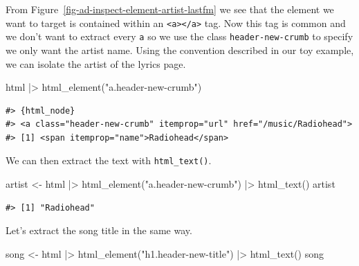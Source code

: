 \documentclass[
  letterpaper,
]{scrbook}
\newenvironment{Shaded}{\begin{snugshade}}{\end{snugshade}}
\newcommand{\FunctionTok}[1]{\textcolor[rgb]{0.00,0.00,0.00}{#1}}
\newcommand{\NormalTok}[1]{\textcolor[rgb]{0.00,0.00,0.00}{#1}}
\newcommand{\OtherTok}[1]{\textcolor[rgb]{0.00,0.00,0.00}{#1}}
\newcommand{\SpecialCharTok}[1]{\textcolor[rgb]{0.00,0.00,0.00}{#1}}
\newcommand{\StringTok}[1]{\textcolor[rgb]{0.00,0.00,0.00}{#1}}
\begin{document}
From Figure~\ref{fig-ad-inspect-element-artist-lastfm} we see that the
element we want to target is contained within an
\texttt{\textless{}a\textgreater{}\textless{}/a\textgreater{}} tag. Now
this tag is common and we don't want to extract every \texttt{a} so we
use the class \texttt{header-new-crumb} to specify we only want the
artist name. Using the convention described in our toy example, we can
isolate the artist of the lyrics page.

\begin{Shaded}
\begin{Highlighting}[]
\NormalTok{html }\SpecialCharTok{|\textgreater{}} 
  \FunctionTok{html\_element}\NormalTok{(}\StringTok{"a.header{-}new{-}crumb"}\NormalTok{)}
\end{Highlighting}
\end{Shaded}

\begin{verbatim}
#> {html_node}
#> <a class="header-new-crumb" itemprop="url" href="/music/Radiohead">
#> [1] <span itemprop="name">Radiohead</span>
\end{verbatim}

We can then extract the text with \texttt{html\_text()}.

\begin{Shaded}
\begin{Highlighting}[]
\NormalTok{artist }\OtherTok{\textless{}{-}} 
\NormalTok{  html }\SpecialCharTok{|\textgreater{}} 
  \FunctionTok{html\_element}\NormalTok{(}\StringTok{"a.header{-}new{-}crumb"}\NormalTok{) }\SpecialCharTok{|\textgreater{}} 
  \FunctionTok{html\_text}\NormalTok{()}
\NormalTok{artist}
\end{Highlighting}
\end{Shaded}

\begin{verbatim}
#> [1] "Radiohead"
\end{verbatim}

Let's extract the song title in the same way.

\begin{Shaded}
\begin{Highlighting}[]
\NormalTok{song }\OtherTok{\textless{}{-}} 
\NormalTok{  html }\SpecialCharTok{|\textgreater{}} 
  \FunctionTok{html\_element}\NormalTok{(}\StringTok{"h1.header{-}new{-}title"}\NormalTok{) }\SpecialCharTok{|\textgreater{}} 
  \FunctionTok{html\_text}\NormalTok{()}
\NormalTok{song}
\end{Highlighting}
\end{Shaded}
\end{document}

